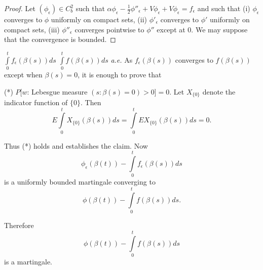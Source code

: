 \begin{proof}
Let $(\phi_{\epsilon})\in C^{2}_{b}$ such that
$\alpha\phi_{\epsilon}-\frac{1}{2}\phi''_{\epsilon}+V\phi_{\epsilon}+V\phi_{\epsilon}=f_{\epsilon}$
and such that (i) $\phi_{\epsilon}$ converges to $\phi$ uniformly on
compact sets, (ii) $\phi'_{\epsilon}$ converges to $\phi'$ uniformly
on compact sets, (iii) $\phi''_{\epsilon}$ converges pointwise to
$\phi''$ except at $0$. We may suppose that the convergence is bounded.
\end{proof}

\begin{claim*}
$\int\limits^{t}_{0}f_{\epsilon}(\beta(s))ds$
  $\int\limits^{t}_{0}f(\beta(s))ds$ {\em a.e.} As
  $f_{\epsilon}(\beta(s))$ converges to $f(\beta(s))$ except when
  $\beta(s)=0$, it is enough to prove that

(*) $P$[$w$: Lebesgue measure $(s:\beta(s)=0)>0$]$=0$. Let $X_{\{0\}}$
    denote the indicator function of $\{0\}$. Then
$$
E\int\limits^{t}_{0}X_{\{0\}}(\beta(s))ds=\int\limits^{t}_{0}EX_{\{0\}}(\beta(s))ds=0. 
$$

Thus (*) holds and establishes the claim. Now
$$
\phi_{\epsilon}(\beta(t))-\int\limits^{t}_{0}f_{\epsilon}(\beta(s))ds
$$
is a uniformly bounded martingale converging to 
$$
\phi(\beta(t))-\int\limits^{t}_{0}f(\beta(s))ds.
$$

Therefore
$$
\phi(\beta(t))-\int\limits^{t}_{0}f(\beta(s))ds
$$
is a martingale.
\end{claim*}


